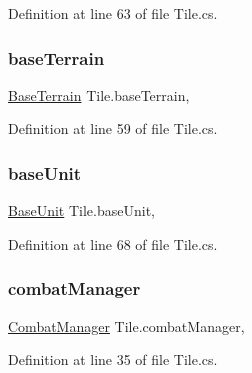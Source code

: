 Definition at line 63 of file Tile.\+cs.

\mbox{\label{class_tile_a36dba2c580e50ce450df4a0b58d69130}} 
\subsubsection{\texorpdfstring{baseTerrain}{baseTerrain}}
{\footnotesize\ttfamily \mbox{\hyperlink{class_base_terrain}{Base\+Terrain}} Tile.\+base\+Terrain\hspace{0.3cm}{\ttfamily [get]}, {\ttfamily [set]}}



Definition at line 59 of file Tile.\+cs.

\mbox{\label{class_tile_a2d5020851ac36840a83e8933da9c2b1e}} 
\subsubsection{\texorpdfstring{baseUnit}{baseUnit}}
{\footnotesize\ttfamily \mbox{\hyperlink{class_base_unit}{Base\+Unit}} Tile.\+base\+Unit\hspace{0.3cm}{\ttfamily [get]}, {\ttfamily [set]}}



Definition at line 68 of file Tile.\+cs.

\mbox{\label{class_tile_a4428192093c158009bdd3b1c12e2bd7b}} 
\subsubsection{\texorpdfstring{combatManager}{combatManager}}
{\footnotesize\ttfamily \mbox{\hyperlink{class_combat_manager}{Combat\+Manager}} Tile.\+combat\+Manager\hspace{0.3cm}{\ttfamily [get]}, {\ttfamily [set]}}



Definition at line 35 of file Tile.\+cs.

\mbox{\label{class_tile_a22382e29b7dc7171420e4df600ad3ea4}} 
